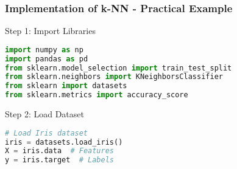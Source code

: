 \documentclass[aspectratio=169]{beamer}
\begin{document}
\begin{frame}[fragile]
    \frametitle{Implementation of k-NN - Practical Example}
    \begin{block}{Step 1: Import Libraries}
        \begin{lstlisting}[language=Python]
import numpy as np
import pandas as pd
from sklearn.model_selection import train_test_split
from sklearn.neighbors import KNeighborsClassifier
from sklearn import datasets
from sklearn.metrics import accuracy_score
        \end{lstlisting}
    \end{block}

    \begin{block}{Step 2: Load Dataset}
        \begin{lstlisting}[language=Python]
# Load Iris dataset
iris = datasets.load_iris()
X = iris.data  # Features
y = iris.target  # Labels
        \end{lstlisting}
    \end{block}
\end{frame}
\end{document}
